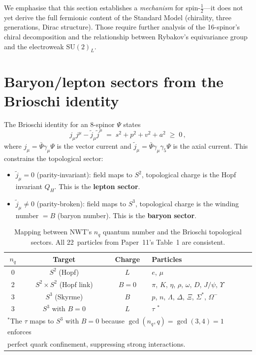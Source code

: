 \documentclass[11pt]{article}
\newcommand{\half}{\tfrac{1}{2}}
\begin{document}
We emphasise that this section establishes a \emph{mechanism} for
spin-$\half$---it does not yet derive the full fermionic content of the
Standard Model (chirality, three generations, Dirac structure).  Those
require further analysis of the 16-spinor's chiral decomposition and
the relationship between Rybakov's equivariance group and the
electroweak $\mathrm{SU}(2)_L$.


\section{Baryon/lepton sectors from the Brioschi identity}
\label{sec:brioschi}

The Brioschi identity for an 8-spinor $\Psi$ states~\cite{Cartan1966}
\begin{equation}
j_\mu j^\mu - \tilde{j}_\mu\tilde{j}^\mu
    \;=\; s^2 + p^2 + v^2 + a^2 \;\geq\; 0\,,
\end{equation}
where $j_\mu = \bar{\Psi}\gamma_\mu\Psi$ is the vector current and
$\tilde{j}_\mu = \bar{\Psi}\gamma_\mu\gamma_5\Psi$ is the axial
current.  This constrains the topological sector:
\begin{itemize}
\item $\tilde{j}_\mu = 0$ (parity-invariant): field maps to $S^2$,
      topological charge is the Hopf invariant $Q_H$.  This is the
      \textbf{lepton sector}.
\item $\tilde{j}_\mu \neq 0$ (parity-broken): field maps to $S^3$,
      topological charge is the winding number $= B$ (baryon number).
      This is the \textbf{baryon sector}.
\end{itemize}

\begin{table}[t]
\centering
\caption{Mapping between NWT's $n_q$ quantum number and the Brioschi
topological sectors.  All 22~particles from Paper~11's Table~1 are
consistent.}
\label{tab:brioschi}
\smallskip
\begin{tabular}{cccl}
\toprule
$n_q$ & Target & Charge & Particles \\
\midrule
0 & $S^2$ (Hopf) & $L$ & $e$, $\mu$ \\
2 & $S^2 \times S^2$ (Hopf link) & $B = 0$ &
    $\pi$, $K$, $\eta$, $\rho$, $\omega$, $D$, $J/\psi$, $\Upsilon$ \\
3 & $S^3$ (Skyrme) & $B$ &
    $p$, $n$, $\Lambda$, $\Delta$, $\Xi$, $\Sigma^*$, $\Omega^-$ \\
3 & $S^3$ with $B = 0$ & $L$ &
    $\tau$ $^*$ \\
\bottomrule
\multicolumn{4}{l}{\small $^*$The $\tau$ maps to $S^3$ with $B = 0$
    because $\gcd(n_q, q) = \gcd(3,4) = 1$ enforces} \\
\multicolumn{4}{l}{\small \phantom{$^*$}perfect quark confinement,
    suppressing strong interactions.} \\
\end{tabular}
\end{table}
\end{document}
